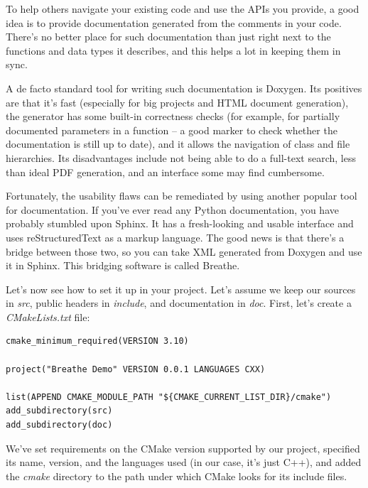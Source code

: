 
To help others navigate your existing code and use the APIs you provide, a good idea is to provide documentation generated from the comments in your code. There's no better place for such documentation than just right next to the functions and data types it describes, and this helps a lot in keeping them in sync.

A de facto standard tool for writing such documentation is Doxygen. Its positives are that it's fast (especially for big projects and HTML document generation), the generator has some built-in correctness checks (for example, for partially documented parameters in a function – a good marker to check whether the documentation is still up to date), and it allows the navigation of class and file hierarchies. Its disadvantages include not being able to do a full-text search, less than ideal PDF generation, and an interface some may find cumbersome.

Fortunately, the usability flaws can be remediated by using another popular tool for documentation. If you've ever read any Python documentation, you have probably stumbled upon Sphinx. It has a fresh-looking and usable interface and uses reStructuredText as a markup language. The good news is that there's a bridge between those two, so you can take XML generated from Doxygen and use it in Sphinx. This bridging software is called Breathe.

Let's now see how to set it up in your project. Let's assume we keep our sources in \textit{src}, public headers in \textit{include}, and documentation in \textit{doc}. First, let's create a \textit{CMakeLists.txt} file:


\begin{lstlisting}[style=styleCMake]
cmake_minimum_required(VERSION 3.10)

project("Breathe Demo" VERSION 0.0.1 LANGUAGES CXX)

list(APPEND CMAKE_MODULE_PATH "${CMAKE_CURRENT_LIST_DIR}/cmake")
add_subdirectory(src)
add_subdirectory(doc)
\end{lstlisting}

We've set requirements on the CMake version supported by our project, specified its name, version, and the languages used (in our case, it's just C++), and added the \textit{cmake} directory to the path under which CMake looks for its include files.


